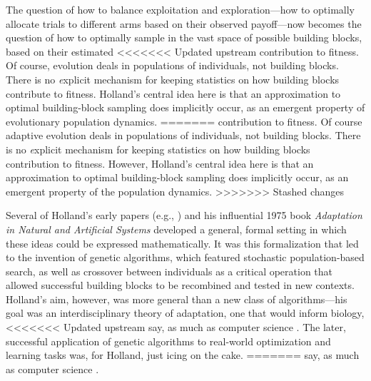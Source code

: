 \documentclass{sig-alternate}
\begin{document}
The question of how to balance exploitation and exploration---how to
optimally allocate trials to different arms based on their observed 
payoff---now becomes the question of how to optimally sample in the
vast space of possible building blocks, based on their estimated
<<<<<<< Updated upstream
contribution to fitness.  Of course, evolution deals in populations of
individuals, not building blocks.  There is no {\emph explicit} mechanism for
keeping statistics on how building blocks contribute to fitness. 
Holland's central idea here is that an approximation to
optimal building-block sampling does implicitly occur, as an emergent
property of evolutionary population dynamics.
=======
contribution to fitness.  Of course adaptive evolution deals in populations of
individuals, not building blocks.  There is no {\emph explicit} mechanism for
keeping statistics on how building blocks contribution to fitness. 
However, Holland's central idea here is that an approximation to
optimal building-block sampling does implicitly occur, as an emergent
property of the population dynamics.
>>>>>>> Stashed changes

Several of Holland's early papers (e.g.,
\cite{Holland1962,Holland1973}) and his influential 1975 book
\emph{Adaptation in Natural and Artificial Systems} \cite{Holland1975}
developed a general, formal setting in which these ideas could be
expressed mathematically.  It was this formalization that led to the
invention of genetic algorithms, which featured stochastic
population-based search, as well as crossover between individuals as a
critical operation that allowed successful building blocks to be
recombined and tested in new contexts.  Holland's aim, however, was
more general than a new class of algorithms---his goal was an
interdisciplinary theory of adaptation, one that would inform biology, 
<<<<<<< Updated upstream
say, as much as computer science \cite{Christiansen1998}.  The later, successful application of
genetic algorithms to real-world optimization and learning tasks was,
for Holland, just icing on the cake.
=======
say, as much as computer science \cite{Christiansen1998}.

\end{document}
